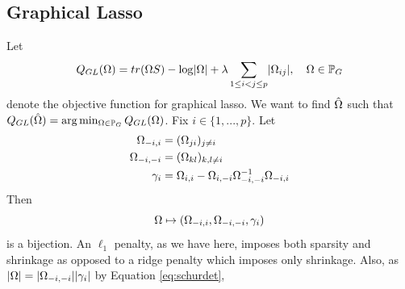 \documentclass[12pt, leqno]{article}
\providecommand{\abs}[1]{\lvert#1\rvert}
\let\oldhat\hat
\renewcommand{\hat}[1]{\oldhat{{#1}}}
\def\om{\ensuremath\Omega}
\def\pg{\ensuremath\mathbb{P}_{{G}}}
\begin{document}
\subsection{Graphical Lasso}
Let 
\[
Q_{GL}(\om) = tr(\om S) - \log \abs{\om} + \lambda \sum_{1\leq i<j
  \leq p} \abs{\om_{ij}}, \quad \om \in \pg
\]
denote the objective function for graphical lasso. We want to find
$\hat{\om}$ such that $Q_{GL}(\hat{\om}) = \arg\min_{\om \in \pg}
Q_{GL}({\om})$. Fix $i \in \{ 1,...,p \}$. Let
\begin{align*}
\om_{-i,i} &= (\om_{ji})_{j\not=i}\\
\om_{-i,-i} &= (\om_{kl})_{k,l\not=i}\\
\gamma_i &= \om_{i,i} - \om_{i,-i}\om_{-i,-i}^{-1}\om_{-i,i}
\end{align*}
Then 
\[
\om \mapsto (\om_{-i,i},\om_{-i,-i},\gamma_i )
\]
is a bijection.
An $\ell_1$ penalty, as we have here, imposes both sparsity and shrinkage as
opposed to a ridge penalty which imposes only shrinkage. Also, as $\abs{\om} = \abs{\om_{-i,-i}}\abs{\gamma_i}$ by
Equation \ref{eq:schurdet},
\end{document}

